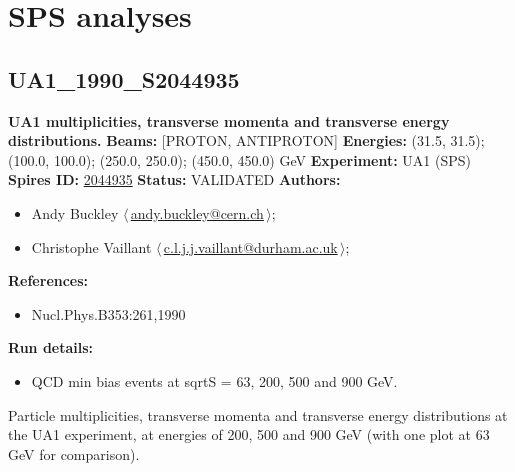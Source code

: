 \section{SPS analyses}\subsection[UA1\_1990\_S2044935]{UA1\_1990\_S2044935\,\cite{Albajar:1989an}}
\textbf{UA1 multiplicities, transverse momenta and transverse energy distributions.}\newline
\textbf{Beams:} [PROTON, ANTIPROTON] \newline
\textbf{Energies:} (31.5, 31.5); (100.0, 100.0); (250.0, 250.0); (450.0, 450.0) GeV \newline
\textbf{Experiment:} UA1 (SPS) \newline
\textbf{Spires ID:} \href{http://www.slac.stanford.edu/spires/find/hep/www?rawcmd=key+2044935}{2044935}\newline
\textbf{Status:} VALIDATED\newline
\textbf{Authors:}
\begin{itemize}
  \item Andy Buckley $\langle\,$\href{mailto:andy.buckley@cern.ch}{andy.buckley@cern.ch}$\,\rangle$;
  \item Christophe Vaillant $\langle\,$\href{mailto:c.l.j.j.vaillant@durham.ac.uk}{c.l.j.j.vaillant@durham.ac.uk}$\,\rangle$;
\end{itemize}
\textbf{References:}
\begin{itemize}
  \item Nucl.Phys.B353:261,1990
\end{itemize}
\textbf{Run details:}
\begin{itemize}

  \item QCD min bias events at sqrtS = 63, 200, 500 and 900 GeV.\end{itemize}

\noindent Particle multiplicities, transverse momenta and transverse energy distributions at the UA1 experiment, at energies of 200, 500 and 900 GeV (with one plot at 63 GeV for comparison).

\clearpage


\clearpage

